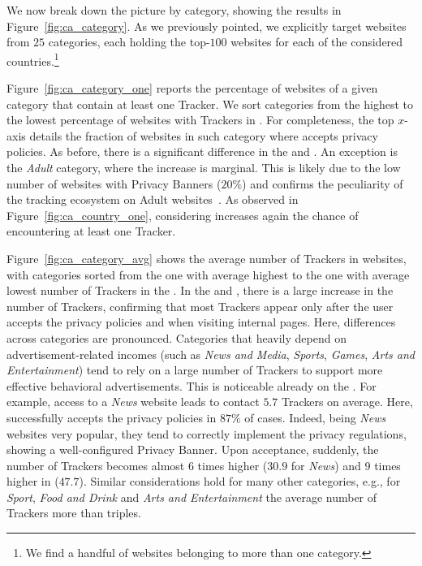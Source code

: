 We now break down the picture by category, showing the results in Figure~\ref{fig:ca_category}. As we previously pointed, we explicitly target websites from $25$ categories, each holding the top-$100$ websites for each of the considered countries.\footnote{We find a handful of websites belonging to more than one category.}

Figure~\ref{fig:ca_category_one} reports the percentage of websites of a given category that contain at least one Tracker. We sort categories from the highest to the lowest percentage of websites with Trackers in \BEFORE. For completeness, the top $x$-axis details the fraction of websites in such category where \TOOL accepts privacy policies. As before, there is a significant difference in the \BEFORE and \AFTER. An exception is the \textit{Adult} category, where the increase is marginal. This is likely due to the low number of websites with Privacy Banners ($20\%$) and confirms the peculiarity of the tracking ecosystem on Adult websites~\cite{vallina2019tales}. As observed in Figure~\ref{fig:ca_country_one}, considering \INTERNAL increases again the chance of encountering at least one Tracker.

Figure~\ref{fig:ca_category_avg} shows the average number of Trackers in websites, with categories sorted from the one with average highest to the one with average lowest number of Trackers in the \BEFORE. In the \AFTER and \INTERNAL, there is a large increase in the number of Trackers, confirming that most Trackers appear only after the user accepts the privacy policies and when visiting internal pages. Here, differences across categories are pronounced. Categories that heavily depend on advertisement-related incomes (such as \textit{News and Media}, \textit{Sports}, \textit{Games}, \textit{Arts and Entertainment}) tend to rely on a large number of Trackers to support more effective behavioral advertisements. This is noticeable already on the \BEFORE. For example, access to a \textit{News} website leads to contact $5.7$ Trackers on average. Here, \TOOL successfully accepts the privacy policies in $87\%$ of cases. Indeed, being \textit{News} websites very popular, they tend to correctly implement the privacy regulations, showing a well-configured Privacy Banner. Upon acceptance, suddenly, the number of Trackers becomes almost 6 times higher ($30.9$ for \textit{News}) and 9 times higher in \INTERNAL ($47.7$). Similar considerations hold for many other categories, e.g., for \emph{Sport}, \emph{Food and Drink} and \emph{Arts and Entertainment} the average number of Trackers more than triples.

